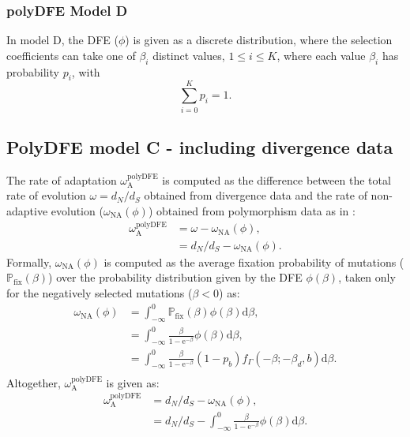 \documentclass{article}
\newcommand{\der}{\mathrm{d}}
\newcommand{\e}{\mathrm{e}}
\newcommand{\dn}{d_N}
\newcommand{\ds}{d_S}
\newcommand{\dnds}{\dn / \ds}
\newcommand{\rateApop}{\omega_{\mathrm{A}}}
\newcommand{\proba}{\mathbb{P}}
\newcommand{\pfix}{\proba_{\mathrm{fix}}}
\newcommand{\Spop}{\beta}
\begin{document}
    \subsubsection*{polyDFE Model D}
    In model D, the DFE ($\phi$) is given as a discrete distribution, where the selection coefficients can take one of $\Spop_i$ distinct
    values, $1 \leq i \leq K$, where each value $\Spop_i$ has probability $p_i$, with
    \begin{equation*}
        \sum\limits_{i=0}^{K} p_i = 1.
    \end{equation*}

    \subsection{PolyDFE model C - including divergence data}
    The rate of adaptation $\rateApop^{\mathrm{polyDFE}}$ is computed as the difference between the total rate of evolution $\omega=\dnds$ obtained from divergence data and the rate of non-adaptive evolution ($\omega_{\mathrm{NA}}(\phi)$) obtained from polymorphism data as in \textcite{tataru_inference_2017}:
    \begin{align*}
        \rateApop^{\mathrm{polyDFE}} &= \omega - \omega_{\mathrm{NA}}(\phi), \\
        &= \dnds - \omega_{\mathrm{NA}}(\phi).
    \end{align*}
    Formally, $\omega_{\mathrm{NA}}(\phi)$ is computed as the average fixation probability of mutations ($\pfix (\Spop)$) over the probability distribution given by the DFE $\phi (\Spop)$, taken only for the negatively selected mutations ($\Spop < 0$) as:
    \begin{align*}
        \omega_{\mathrm{NA}}(\phi) &= \int_{-\infty}^{0} \pfix (\Spop) \phi (\Spop) \der \Spop, \\
        &= \int_{-\infty}^{0} \frac{\Spop}{1 - \e^{-\Spop}} \phi (\Spop) \der \Spop, \\
        &= \int_{-\infty}^{0} \frac{\Spop}{1 - \e^{-\Spop}} \left( 1 - p_b \right) f_{\Gamma}(-\Spop; -\Spop_d, b) \der \Spop. \\
    \end{align*}
    Altogether, $\rateApop^{\mathrm{polyDFE}}$ is given as:
    \begin{align*}
        \rateApop^{\mathrm{polyDFE}} &= \dnds - \omega_{\mathrm{NA}}(\phi), \\
        &= \dnds - \int_{-\infty}^{0} \frac{\Spop}{1 - \e^{-\Spop}} \phi (\Spop) \der \Spop.
    \end{align*}
    
\end{document}
